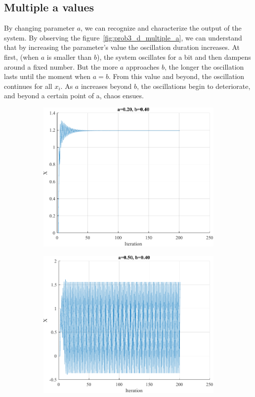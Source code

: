 \subsection{Multiple a values}

By changing parameter $a$, we can recognize and characterize the output of the system. By observing the figure~\ref{fig:prob3_d_multiple_a}, we can understand that by increasing the parameter's value the oscillation duration increases. At first, (when $a$ is smaller than $b$), the system oscillates for a bit and then dampens around a fixed number. But the more $a$ approaches $b$, the longer the oscillation lasts until the moment when $a=b$.
From this value and beyond, the oscillation continues for all $x_i$. As $a$ increases beyond $b$, the oscillations begin to deteriorate, and beyond a certain point of a, chaos ensues.
\begin{figure}[H]
	\centering
	\begin{subfigure}{0.3\textwidth}
		\centering
		\includegraphics[width=\textwidth]{../Problem 3/prob3_(d)_a_0.20_b_0.40.pdf}
		\caption{}
	\end{subfigure}
	\begin{subfigure}{0.3\textwidth}
		\centering
		\includegraphics[width=\textwidth]{../Problem 3/prob3_(d)_a_0.50_b_0.40.pdf}

\end{subfigure}
\end{figure}
